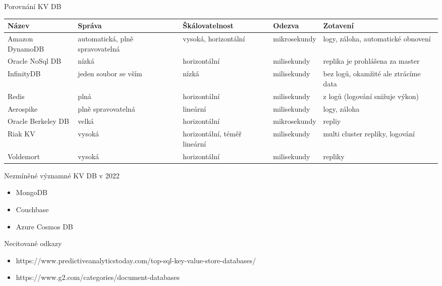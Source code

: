 \documentclass{article}
\begin{document}
	\begin{section} {Porovnání KV DB}
			\begin{tabular}{ |l||p{2cm} p{2cm} l p{4cm} | } 
				\hline
				Název & Správa & Škálovatelnost & Odezva & Zotavení \\
				\hline
				Amazon DynamoDB & automatická, plně spravovatelná & vysoká, horizontální & mikrosekundy & logy, záloha, automatické obnovení \\
				\hline
				Oracle NoSql DB & nízká & horizontální & milisekundy & replika je prohlášena za master\\ 
				\hline
				InfinityDB & jeden soubor se vším & nízká & milisekundy & bez logů, okamžité ale ztrácíme data\\ 
				\hline
				Redis & plná & horizontální & milisekundy & z logů (logování snižuje výkon)\\
				\hline
				Aerospike & plně spravovatelná & lineární & milisekundy &  logy, záloha\\
				\hline
				Oracle Berkeley DB & velká & horizontální & mikrosekundy & repliy \\
				\hline
				Riak KV & vysoká & horizontální, téměř lineární & milisekundy & multi cluster repliky, logování\\
				\hline
				Voldemort & vysoká & horizontální & milisekundy &  repliky \\
				\hline
			\end{tabular}
	\end{section}

	\begin{section} {Nezmíněné významné KV DB v 2022}
		\begin{itemize}
			\item MongoDB
			\item Couchbase
			\item Azure Cosmos DB
		\end{itemize}
	\end{section}
	 
	 \begin{section}{Necitované odkazy}
	 	\begin{itemize}
	 		\item https://www.predictiveanalyticstoday.com/top-sql-key-value-store-databases/
	 		\item https://www.g2.com/categories/document-databases
	 	\end{itemize}
	 \end{section}
\end{document}
